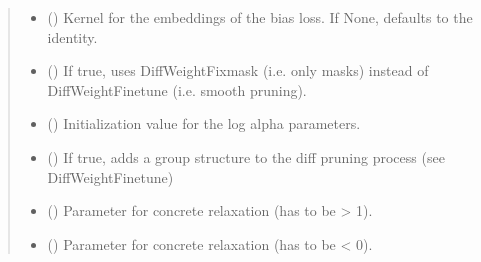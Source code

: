 \documentclass[letterpaper,10pt,english]{sphinxmanual}
\begin{document}
\begin{fulllineitems}
\begin{fulllineitems}
\begin{quote}
\begin{description}
\begin{itemize}
\item {} 
\sphinxAtStartPar
{} () \textendash{} Kernel for the embeddings of the bias loss. If None, defaults to the identity.

\item {} 
\sphinxAtStartPar
{} () \textendash{} If true, uses DiffWeightFixmask (i.e. only masks) instead of DiffWeightFinetune (i.e. smooth pruning).

\item {} 
\sphinxAtStartPar
{} (\sphinxstyleliteralemphasis{\sphinxupquote{{[}}}\sphinxstyleliteralemphasis{\sphinxupquote{{[}}}\sphinxstyleliteralemphasis{\sphinxupquote{, }}\sphinxstyleliteralemphasis{\sphinxupquote{{]}}}\sphinxstyleliteralemphasis{\sphinxupquote{{]}}}) \textendash{} Initialization value for the log alpha parameters.

\item {} 
\sphinxAtStartPar
{} (\sphinxstyleliteralemphasis{\sphinxupquote{{[}}}\sphinxstyleliteralemphasis{\sphinxupquote{{]}}}) \textendash{} If true, adds a group structure to the diff pruning process (see DiffWeightFinetune)

\item {} 
\sphinxAtStartPar
{} () \textendash{} Parameter for concrete relaxation (has to be \textgreater{} 1).

\item {} 
\sphinxAtStartPar
{} () \textendash{} Parameter for concrete relaxation (has to be \textless{} 0).

\end{itemize}

\end{description}\end{quote}

\end{fulllineitems}


\end{fulllineitems}
\end{document}

